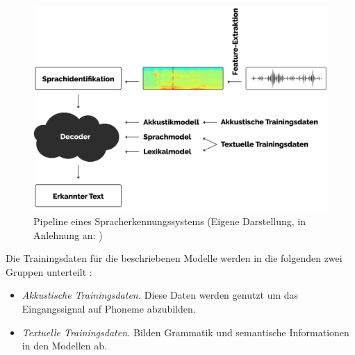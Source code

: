 \begin{figure}[h!]
    \centering
    \includegraphics[width=1\linewidth]{images/pipeline}
    \caption{Pipeline eines Spracherkennungssystems (Eigene Darstellung, in Anlehnung an: \cite{Tom.2016}) }%
    \label{fig:pipeline}
\end{figure}

Die Trainingsdaten für die beschriebenen Modelle werden in die folgenden zwei Gruppen unterteilt \cite{Tom.2016}:

\begin{itemize}
    \item \textit{Akkustische Trainingsdaten.} Diese Daten werden genutzt um das Eingangssignal auf Phoneme abzubilden.
    \item \textit{Textuelle Trainingsdaten.} Bilden Grammatik und semantische Informationen in den Modellen ab.
\end{itemize}